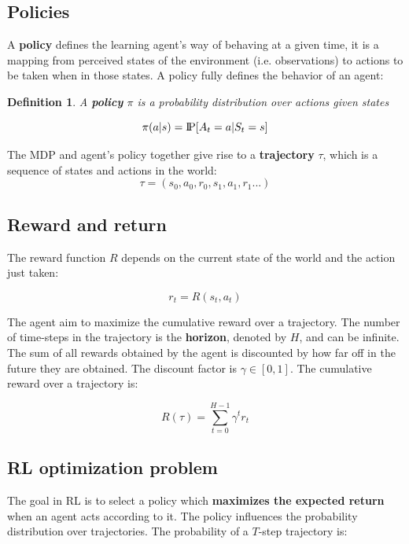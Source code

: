 \documentclass{article}
\newtheorem{definition}{Definition}
\newcommand{\Pprob}{\text{I\kern-0.15em P}}
\begin{document}
\subsection{Policies}
A \textbf{policy} defines the learning agent's way of behaving at a given time, it is a mapping from perceived states of the environment (i.e. observations) to actions to be taken when in those states. A policy fully defines the behavior of an agent:

\begin{definition}
	 A \textbf{policy} $\pi$ is a probability distribution over actions given states
	
	\begin{equation}
	\pi(a | s) = \Pprob[A_t=a|S_t=s]
	\end{equation}

\end{definition}

The MDP and agent's policy together give rise to a \textbf{trajectory} $\tau$, which is a sequence of states and actions in the world:
$$\tau = (s_0, a_0, r_0, s_1, a_1, r_1...)$$


\subsection{Reward and return}
The reward function $R$ depends on the current state of the world and the action just taken:

$$r_t = R(s_t, a_t)$$

The agent aim to maximize the cumulative reward over a trajectory. The number of time-steps in the trajectory is the \textbf{horizon}, denoted by $H$, and can be infinite. The sum of all rewards obtained by the agent is discounted by how far off in the future they are obtained. The discount factor is $\gamma \in [0,1]$. The cumulative reward over a trajectory is:

\begin{equation}
R(\tau) = \sum_{t=0}^{H-1} \gamma^t r_t
\end{equation}

\subsection{RL optimization problem}
The goal in RL is to select a policy which \textbf{maximizes the expected return} when an agent acts according to it. The policy influences the probability distribution over trajectories. The probability of a $T$-step trajectory is:
\end{document}
